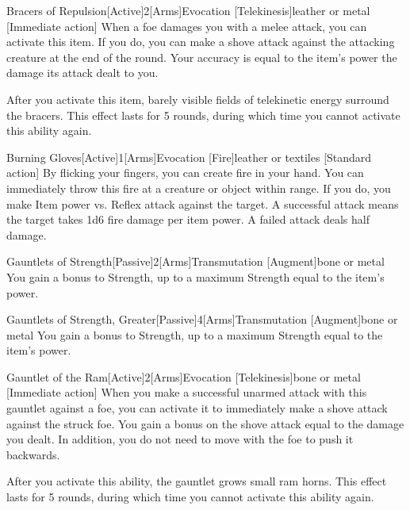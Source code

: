         \begin{magicitemdef}{Bracers of Repulsion}[Active]{2}[Arms]{Evocation [Telekinesis]}{leather or metal}
            [Immediate action] When a foe damages you with a melee attack, you can activate this item.
            If you do, you can make a shove attack against the attacking creature at the end of the round.
            Your accuracy is equal to the item's power \add the damage its attack dealt to you.

            After you activate this item, barely visible fields of telekinetic energy surround the bracers.
            This effect lasts for 5 rounds, during which time you cannot activate this ability again.
        \end{magicitemdef}

        \begin{magicitemdef}{Burning Gloves}[Active]{1}[Arms]{Evocation [Fire]}{leather or textiles}
            [Standard action] By flicking your fingers, you can create fire in your hand.
            You can immediately throw this fire at a creature or object within \rngmed range.
            If you do, you make Item power vs. Reflex attack against the target.
            A successful attack means the target takes 1d6 fire damage per item power.
            A failed attack deals half damage.
        \end{magicitemdef}

        \begin{magicitemdef}{Gauntlets of Strength}[Passive]{2}[Arms]{Transmutation [Augment]}{bone or metal}
             You gain a  bonus to Strength, up to a maximum Strength equal to the item's power.
        \end{magicitemdef}

        \begin{magicitemdef}{Gauntlets of Strength, Greater}[Passive]{4}[Arms]{Transmutation [Augment]}{bone or metal}
             You gain a  bonus to Strength, up to a maximum Strength equal to the item's power.
        \end{magicitemdef}

        \begin{magicitemdef}{Gauntlet of the Ram}[Active]{2}[Arms]{Evocation [Telekinesis]}{bone or metal}
            [Immediate action] When you make a successful unarmed attack with this gauntlet against a foe, you can activate it to immediately make a shove attack against the struck foe.
            You gain a bonus on the shove attack equal to the damage you dealt.
            In addition, you do not need to move with the foe to push it backwards.

            After you activate this ability, the gauntlet grows small ram horns.
            This effect lasts for 5 rounds, during which time you cannot activate this ability again.
        \end{magicitemdef}

